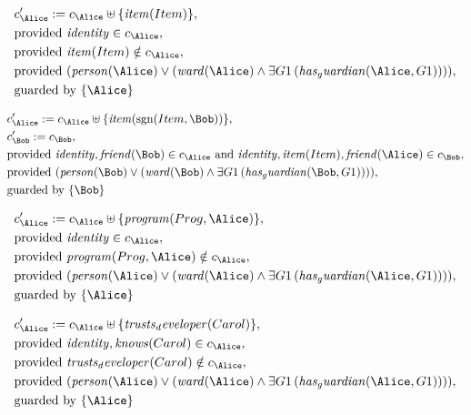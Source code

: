 \begin{align*}
&
c'_
{
\Alice
}
 := 
c_
{
\Alice
}
 \uplus 
\{
\mathit{
item
}
(
Item
)
\}
,\\
&
\text{provided } 
\mathit{
identity
}
 \in c_
{
\Alice
}
,\\
&
\text{provided } 
\mathit{
item
}
(
Item
)
 \notin c_
{
\Alice
}
,\\
&
\text{provided } 
(
\mathit{
person
}
(
\Alice
)
\lor
(
\mathit{
ward
}
(
\Alice
)
\land
\exists 
G1
\,(
\mathit{
has_guardian
}
(
\Alice
,
G1
)
)
)
)
,\\
&
\text{guarded by } \{
\Alice
\}
\end{align*}

\begin{align*}
&
c'_
{
\Alice
}
 := 
c_
{
\Alice
}
 \uplus 
\{
\mathit{
item
}
(
\mathrm{sgn}(
Item
,
\Bob
)
)
\}
,\\
&
c'_
{
\Bob
}
 := 
c_
{
\Bob
}
,\\
&
\text{provided } 
\mathit{
identity
}
,
\mathit{
friend
}
(
\Bob
)
 \in c_
{
\Alice
}
 \text{ and } 
\mathit{
identity
}
,
\mathit{
item
}
(
Item
)
,
\mathit{
friend
}
(
\Alice
)
 \in c_
{
\Bob
}
,\\
&
\text{provided } 
(
\mathit{
person
}
(
\Bob
)
\lor
(
\mathit{
ward
}
(
\Bob
)
\land
\exists 
G1
\,(
\mathit{
has_guardian
}
(
\Bob
,
G1
)
)
)
)
,\\
&
\text{guarded by } \{
\Bob
\}
\end{align*}

\begin{align*}
&
c'_
{
\Alice
}
 := 
c_
{
\Alice
}
 \uplus 
\{
\mathit{
program
}
(
Prog
,
\Alice
)
\}
,\\
&
\text{provided } 
\mathit{
identity
}
 \in c_
{
\Alice
}
,\\
&
\text{provided } 
\mathit{
program
}
(
Prog
,
\Alice
)
 \notin c_
{
\Alice
}
,\\
&
\text{provided } 
(
\mathit{
person
}
(
\Alice
)
\lor
(
\mathit{
ward
}
(
\Alice
)
\land
\exists 
G1
\,(
\mathit{
has_guardian
}
(
\Alice
,
G1
)
)
)
)
,\\
&
\text{guarded by } \{
\Alice
\}
\end{align*}

\begin{align*}
&
c'_
{
\Alice
}
 := 
c_
{
\Alice
}
 \uplus 
\{
\mathit{
trusts_developer
}
(
Carol
)
\}
,\\
&
\text{provided } 
\mathit{
identity
}
,
\mathit{
knows
}
(
Carol
)
 \in c_
{
\Alice
}
,\\
&
\text{provided } 
\mathit{
trusts_developer
}
(
Carol
)
 \notin c_
{
\Alice
}
,\\
&
\text{provided } 
(
\mathit{
person
}
(
\Alice
)
\lor
(
\mathit{
ward
}
(
\Alice
)
\land
\exists 
G1
\,(
\mathit{
has_guardian
}
(
\Alice
,
G1
)
)
)
)
,\\
&
\text{guarded by } \{
\Alice
\}
\end{align*}
